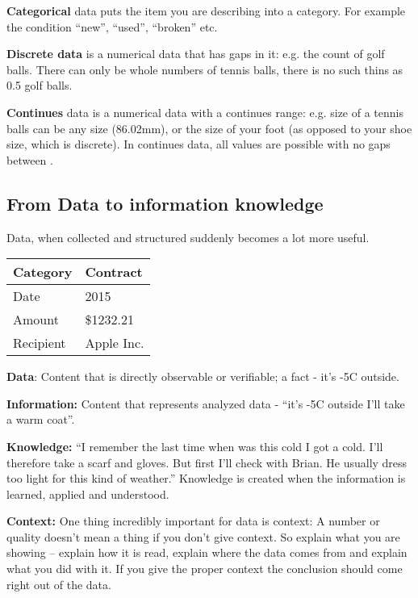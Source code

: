 \documentclass[letterpaper,12pt,oneside]{sphinxmanual}
\begin{document}
\textbf{Categorical} data puts the item you are describing into a category. For example the condition “new”, “used”, “broken” etc.

\textbf{Discrete data} is a numerical data that has gaps in it: e.g. the count of golf balls. There can only be whole numbers of tennis balls, there is no such thins as 0.5 golf balls.

\textbf{Continues} data is a numerical data with a continues range: e.g. size of a tennis balls can be any size (86.02mm), or the size of your foot (as opposed to your shoe size, which is discrete). In continues data, all values are possible with no gaps between .


\subsection{From Data to information knowledge}
\label{introduction:from-data-to-information-knowledge}
Data, when collected and structured suddenly becomes a lot more useful.

\begin{tabulary}{\linewidth}{|L|L|}
\hline
\textsf{\relax 
Category
} & \textsf{\relax 
Contract
}\\
\hline
Date
 & 
2015
\\
\hline
Amount
 & 
\$1232.21
\\
\hline
Recipient
 & 
Apple Inc.
\\
\hline\end{tabulary}


\textbf{Data}: Content that is directly observable or verifiable; a fact - it’s -5C outside.

\textbf{Information:} Content that represents analyzed data - “it’s -5C outside I’ll take a warm coat''.

\textbf{Knowledge:} “I remember the last time when was this cold I got a cold. I’ll therefore take a scarf and gloves.
But first I’ll check with Brian. He usually dress too light for this kind of weather.”
Knowledge is created when the information is learned, applied and understood.

\textbf{Context:} One thing incredibly important for data is context: A number or quality doesn’t mean a thing if you don’t give context.
So explain what you are showing – explain how it is read, explain where the data comes from and explain what you did with it.
If you give the proper context the conclusion should come right out of the data.
\end{document}

